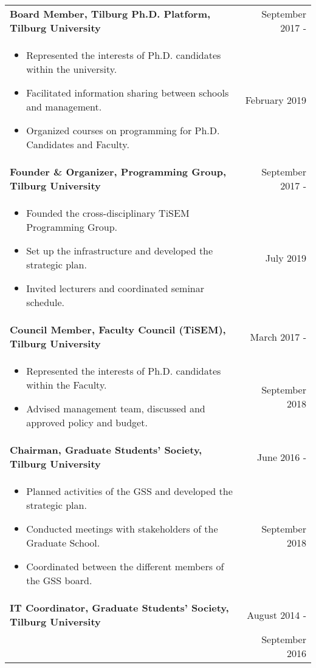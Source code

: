 \documentclass[a4paper,9pt]{article}
\begin{document}
\begin{tabular}{p{15cm}r}
\textbf{Board Member, Tilburg Ph.D. Platform, Tilburg University}  &September 2017 -\\ \vspace{-0.5em}
  \begin{itemize}
    \item Represented the interests of Ph.D. candidates within the university.
    \item Facilitated information sharing between schools and management.
    \item Organized courses on programming for Ph.D. Candidates and Faculty.
  \end{itemize} & February 2019\phantom{ -}\vspace{0.5em}\\
\textbf{Founder \& Organizer, Programming Group, Tilburg University}  &September 2017 -\\ \vspace{-0.5em}
  \begin{itemize}[noitemsep]
    \item Founded the cross-disciplinary TiSEM Programming Group.
    \item Set up the infrastructure and developed the strategic plan.
    \item Invited lecturers and coordinated seminar schedule.
  \end{itemize} & July 2019\phantom{ -}\vspace{0.5em} \\
\textbf{Council Member, Faculty Council (TiSEM), Tilburg University}  &March 2017 -\\ \vspace{-0.5em}
  \begin{itemize}[noitemsep]
    \item Represented the interests of Ph.D. candidates within the Faculty.
    \item Advised management team, discussed and approved policy and budget.
  \end{itemize} & September 2018\phantom{ -}\vspace{0.5em} \\
\textbf{Chairman, Graduate Students' Society, Tilburg University}  &June 2016 -\\ \vspace{-0.5em}
  \begin{itemize}[noitemsep]
    \item Planned activities of the GSS and developed the strategic plan.
    \item Conducted meetings with stakeholders of the Graduate School.
    \item Coordinated between the different members of the GSS board.
  \end{itemize} & September 2018\phantom{ -}\vspace{0.5em} \\
\textbf{IT Coordinator, Graduate Students' Society, Tilburg University} &August 2014 -\\
  & September 2016\phantom{ -}\vspace{0.5em}\\
\end{tabular}
\end{document}
